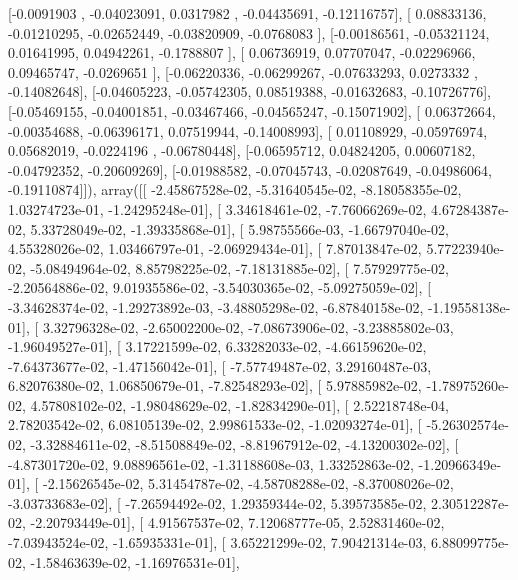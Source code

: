 \documentclass{article}
\begin{document}
       [-0.0091903 , -0.04023091,  0.0317982 , -0.04435691, -0.12116757],
       [ 0.08833136, -0.01210295, -0.02652449, -0.03820909, -0.0768083 ],
       [-0.00186561, -0.05321124,  0.01641995,  0.04942261, -0.1788807 ],
       [ 0.06736919,  0.07707047, -0.02296966,  0.09465747, -0.0269651 ],
       [-0.06220336, -0.06299267, -0.07633293,  0.0273332 , -0.14082648],
       [-0.04605223, -0.05742305,  0.08519388, -0.01632683, -0.10726776],
       [-0.05469155, -0.04001851, -0.03467466, -0.04565247, -0.15071902],
       [ 0.06372664, -0.00354688, -0.06396171,  0.07519944, -0.14008993],
       [ 0.01108929, -0.05976974,  0.05682019, -0.0224196 , -0.06780448],
       [-0.06595712,  0.04824205,  0.00607182, -0.04792352, -0.20609269],
       [-0.01988582, -0.07045743, -0.02087649, -0.04986064, -0.19110874]]), array([[ -2.45867528e-02,  -5.31640545e-02,  -8.18058355e-02,
          1.03274723e-01,  -1.24295248e-01],
       [  3.34618461e-02,  -7.76066269e-02,   4.67284387e-02,
          5.33728049e-02,  -1.39335868e-01],
       [  5.98755566e-03,  -1.66797040e-02,   4.55328026e-02,
          1.03466797e-01,  -2.06929434e-01],
       [  7.87013847e-02,   5.77223940e-02,  -5.08494964e-02,
          8.85798225e-02,  -7.18131885e-02],
       [  7.57929775e-02,  -2.20564886e-02,   9.01935586e-02,
         -3.54030365e-02,  -5.09275059e-02],
       [ -3.34628374e-02,  -1.29273892e-03,  -3.48805298e-02,
         -6.87840158e-02,  -1.19558138e-01],
       [  3.32796328e-02,  -2.65002200e-02,  -7.08673906e-02,
         -3.23885802e-03,  -1.96049527e-01],
       [  3.17221599e-02,   6.33282033e-02,  -4.66159620e-02,
         -7.64373677e-02,  -1.47156042e-01],
       [ -7.57749487e-02,   3.29160487e-03,   6.82076380e-02,
          1.06850679e-01,  -7.82548293e-02],
       [  5.97885982e-02,  -1.78975260e-02,   4.57808102e-02,
         -1.98048629e-02,  -1.82834290e-01],
       [  2.52218748e-04,   2.78203542e-02,   6.08105139e-02,
          2.99861533e-02,  -1.02093274e-01],
       [ -5.26302574e-02,  -3.32884611e-02,  -8.51508849e-02,
         -8.81967912e-02,  -4.13200302e-02],
       [ -4.87301720e-02,   9.08896561e-02,  -1.31188608e-03,
          1.33252863e-02,  -1.20966349e-01],
       [ -2.15626545e-02,   5.31454787e-02,  -4.58708288e-02,
         -8.37008026e-02,  -3.03733683e-02],
       [ -7.26594492e-02,   1.29359344e-02,   5.39573585e-02,
          2.30512287e-02,  -2.20793449e-01],
       [  4.91567537e-02,   7.12068777e-05,   2.52831460e-02,
         -7.03943524e-02,  -1.65935331e-01],
       [  3.65221299e-02,   7.90421314e-03,   6.88099775e-02,
         -1.58463639e-02,  -1.16976531e-01],
\end{document}
